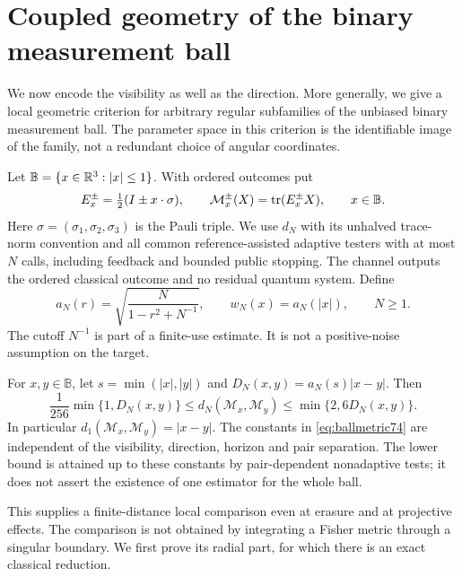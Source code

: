 \section{Coupled geometry of the binary measurement ball}\label{sec:coupled74}
We now encode the visibility as well as the direction. More generally,
we give a local geometric criterion for arbitrary regular subfamilies
of the unbiased binary measurement ball. The parameter space in this
criterion is the identifiable image of the family, not a redundant
choice of angular coordinates.

Let $\mathbb B=\{x\in\mathbb R^3:|x|\le1\}$. With ordered outcomes put
\begin{equation}\label{eq:ballfamily74}
 E_x^\pm=\tfrac12(I\pm x\cdot\sigma),\qquad
 \mathcal M_x^\pm(X)=\operatorname{tr}(E_x^\pm X),\qquad x\in\mathbb B.
\end{equation}
Here $\sigma=(\sigma_1,\sigma_2,\sigma_3)$ is the Pauli triple. We use
$d_N$ with its unhalved trace-norm convention and all common
reference-assisted adaptive testers with at most $N$ calls, including
feedback and bounded public stopping. The channel outputs the ordered
classical outcome and no residual quantum system. Define
\begin{equation}\label{eq:weight74}
 a_N(r)=\sqrt{\frac{N}{1-r^2+N^{-1}}},\qquad
 w_N(x)=a_N(|x|),\qquad N\ge1.
\end{equation}
The cutoff $N^{-1}$ is part of a finite-use estimate. It is not a
positive-noise assumption on the target.

\begin{theorem}\label{thm:ballmetric74}
For $x,y\in\mathbb B$, let $s=\min(|x|,|y|)$ and
$D_N(x,y)=a_N(s)|x-y|$. Then
\begin{equation}\label{eq:ballmetric74}
 \frac1{256}\min\{1,D_N(x,y)\}
 \le d_N(\mathcal M_x,\mathcal M_y)
 \le\min\{2,6D_N(x,y)\}.
\end{equation}
In particular $d_1(\mathcal M_x,\mathcal M_y)=|x-y|$. The constants
in \eqref{eq:ballmetric74} are independent of the visibility, direction,
horizon and pair separation. The lower bound is attained up to these
constants by pair-dependent nonadaptive tests; it does not assert the
existence of one estimator for the whole ball.
\end{theorem}
This supplies a finite-distance local comparison even at erasure and
at projective effects. The comparison is not obtained by integrating a
Fisher metric through a singular boundary. We first prove its radial
part, for which there is an exact classical reduction.

